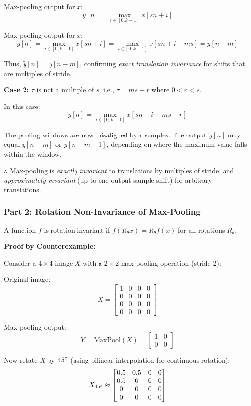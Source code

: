 \documentclass[12pt]{article}
\begin{document}
Max-pooling output for $x$:
$$
y[n] = \max_{i \in [0, k-1]} x[sn + i]
$$

Max-pooling output for $\tilde{x}$:
$$
\tilde{y}[n] = \max_{i \in [0, k-1]} \tilde{x}[sn + i] = \max_{i \in [0, k-1]} x[sn + i - ms] = y[n - m]
$$

Thus, $\tilde{y}[n] = y[n - m]$, confirming \textit{exact translation invariance} for shifts that are multiples of stride.

\textbf{Case 2:} $\tau$ is not a multiple of $s$, i.e., $\tau = ms + r$ where $0 < r < s$.

In this case:
$$
\tilde{y}[n] = \max_{i \in [0, k-1]} x[sn + i - ms - r]
$$

The pooling windows are now misaligned by $r$ samples. The output $\tilde{y}[n]$ may equal $y[n-m]$ or $y[n-m-1]$, depending on where the maximum value falls within the window.

$\therefore$ Max-pooling is \textit{exactly invariant} to translations by multiples of stride, and \textit{approximately invariant} (up to one output sample shift) for arbitrary translations.

\subsubsection*{Part 2: Rotation Non-Invariance of Max-Pooling}
A function $f$ is rotation invariant if $f(R_{\theta} x) = R_{\theta} f(x)$ for all rotations $R_{\theta}$.

\textbf{Proof by Counterexample:}

Consider a $4 \times 4$ image $X$ with a $2 \times 2$ max-pooling operation (stride 2):

Original image:
$$
X = \begin{bmatrix}
1 & 0 & 0 & 0 \\
0 & 0 & 0 & 0 \\
0 & 0 & 0 & 0 \\
0 & 0 & 0 & 0
\end{bmatrix}
$$

Max-pooling output:
$$
Y = \text{MaxPool}(X) = \begin{bmatrix}
1 & 0 \\
0 & 0
\end{bmatrix}
$$

Now rotate $X$ by $45\degree$ (using bilinear interpolation for continuous rotation):
$$
X_{45\degree} \approx \begin{bmatrix}
0.5 & 0.5 & 0 & 0 \\
0.5 & 0 & 0 & 0 \\
0 & 0 & 0 & 0 \\
0 & 0 & 0 & 0
\end{bmatrix}
$$
\end{document}
